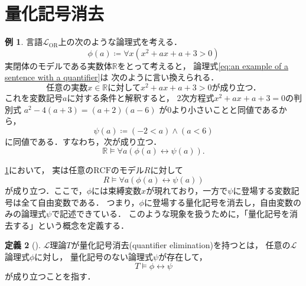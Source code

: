 \documentclass[uplatex, dvipdfmx]{jsarticle}
\numberwithin{equation}{section}
\newcommand{\R}{\mathbb{R}}
\newcommand{\RCF}{\mathrm{RCF}}
\theoremstyle{definition}
\newtheorem{definition}{定義}[section]
\newtheorem{example}[definition]{例}
\begin{document}
\section{量化記号消去}

\begin{example} \label{example:quantifier elimination}
     言語$\mathcal{L}_\mathrm{OR}$上の次のような論理式を考える．
     \begin{equation} \label{eq:an example of a sentence with a quantifier}
          \phi(a) \coloneqq \forall x (x^2 + ax + a + 3 > 0)
     \end{equation}
     実閉体のモデルである実数体$\R$をとって考えると，
     論理式\eqref{eq:an example of a sentence with a quantifier}は
     次のように言い換えられる．
     \begin{equation}
          \text{任意の実数$x \in \R$に対して$x^2 + ax + a + 3 > 0$が成り立つ．}  
     \end{equation}
     これを変数記号$a$に対する条件と解釈すると，
     2次方程式$x^2 + ax + a + 3 = 0$の判別式
     $
     a^2 - 4 (a+3) = (a+2)(a-6)
     $
     が0より小さいことと同値であるから，
     \begin{equation}
          \psi(a) \coloneqq (-2 < a) \land (a < 6)
     \end{equation}
     に同値である．すなわち，次が成り立つ．
     \begin{equation}
          \R \models \forall a (\phi(a) \leftrightarrow \psi(a)).
     \end{equation}
\end{example}

\cref{example:quantifier elimination}において，
実は任意の$\RCF$のモデル$R$に対して
\begin{equation}
     R \models \forall a (\phi(a) \leftrightarrow \psi(a))
\end{equation}
が成り立つ．ここで，$\phi$には束縛変数$x$が現れており，一方で$\psi$に登場する変数記号は全て自由変数である．
つまり，$\phi$に登場する量化記号を消去し，自由変数のみの論理式$\psi$で記述できている．
このような現象を扱うために，「量化記号を消去する」という概念を定義する．


\begin{definition}[{\cite[Definition 3.1.1]{MR1924282}}]
$\mathcal{L}$理論$T$が量化記号消去(quantifier elimination)を持つとは，
任意の$\mathcal{L}$論理式$\phi$に対し，
量化記号のない論理式$\psi$が存在して，
\begin{equation}
     T \models \phi \leftrightarrow \psi
\end{equation}
が成り立つことを指す．
\end{definition}
\end{document}
